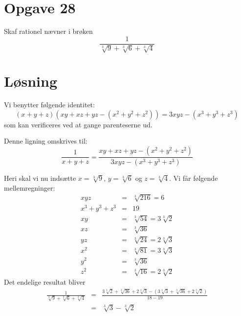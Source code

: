 \documentclass[12pt,oneside,a4paper]{article}
\newcommand{\bas}{\begin{eqnarray*}}
\newcommand{\eas}{\end{eqnarray*}}
\begin{document}
\section{Opgave 28}
Skaf rationel nævner i brøken
$$
\frac{1}{\sqrt[3]9 + \sqrt[3]6 + \sqrt[3]4}
$$

\section{Løsning}
Vi benytter følgende identitet:
$$
(x+y+z) \left(xy+xz+yz - (x^2+y^2+z^2)\right) = 3xyz - (x^3+y^3+z^3)
$$
som kan verificeres ved at gange parenteserne ud.

Denne ligning omskrives til:
$$
\frac{1}{x+y+z} = \frac{xy+xz+yz - (x^2+y^2+z^2)}{3xyz - (x^3+y^3+z^3)}
$$

Heri skal vi nu indsætte $x=\sqrt[3]9$, $y=\sqrt[3]6$ og $z=\sqrt[3]4$. Vi får følgende mellemregninger:
\bas
xyz &=& \sqrt[3]{216} = 6\\
x^3+y^3+z^3 &=& 19 \\
xy &=& \sqrt[3]{54} = 3\sqrt[3]2 \\
xz &=& \sqrt[3]{36} \\
yz &=& \sqrt[3]{24} = 2\sqrt[3]3 \\
x^2 &=& \sqrt[3]{81} = 3\sqrt[3]3 \\
y^2 &=& \sqrt[3]{36} \\
z^2 &=& \sqrt[3]{16} = 2\sqrt[3]2
\eas
Det endelige resultat bliver
\bas
\frac{1}{\sqrt[3]9 + \sqrt[3]6 + \sqrt[3]4} 
&=& \frac{3\sqrt[3]2 + \sqrt[3]{36} + 2\sqrt[3]3 - (3\sqrt[3]3 + \sqrt[3]{36} + 2\sqrt[3]2)}{18-19} \\
&=& \sqrt[3]3 - \sqrt[3]2
\eas
\end{document}
